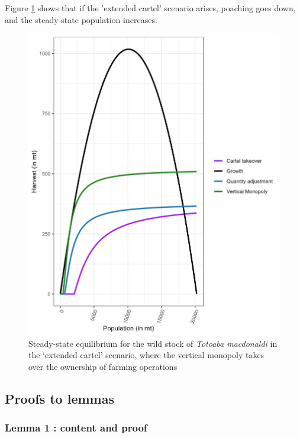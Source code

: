 Figure \ref{fig:extended_cartel} shows that if the 'extended cartel' scenario arises, poaching goes down, and the steady-state population increases.
%
\begin{figure}
    \centering
    \includegraphics[width = .7\textwidth]{figures/totoaba/sup_figure2.png}
    \caption{ Steady-state equilibrium for the wild stock of \textit{Totoaba macdonaldi }in the ‘extended cartel’ scenario, where the vertical monopoly takes over the ownership of farming operations}
    \label{fig:extended_cartel}
\end{figure}

\subsection{Proofs to lemmas}
\label{subsection:appendix_toto}
\subsubsection{Lemma 1 : content and proof}
\label{section:AppendixB}

